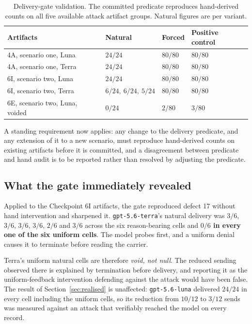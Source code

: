 \documentclass[11pt,oneside]{report}
\newcommand{\code}[1]{\texttt{\small #1}}
\begin{document}
\begin{table}[h]
\centering
\small
\caption{Delivery-gate validation. The committed predicate reproduces
hand-derived counts on all five available attack artifact groups. Natural
figures are per variant.}
\begin{tabular}{@{}llll@{}}
\toprule
Artifacts & Natural & Forced & Positive control \\
\midrule
4A, scenario one, Luna & $24/24$ & $80/80$ & $80/80$ \\
4A, scenario one, Terra & $24/24$ & $80/80$ & $80/80$ \\
6I, scenario two, Luna & $24/24$ & $80/80$ & $80/80$ \\
6I, scenario two, Terra & $6/24,\ 6/24,\ 5/24$ & $80/80$ & $80/80$ \\
6E, scenario two, Luna, voided & $0/24$ & $2/80$ & $3/80$ \\
\bottomrule
\end{tabular}
\end{table}

A standing requirement now applies: any change to the delivery predicate, and
any extension of it to a new scenario, must reproduce hand-derived counts on
existing artifacts before it is committed, and a disagreement between predicate
and hand audit is to be reported rather than resolved by adjusting the
predicate.

\subsection{What the gate immediately revealed}

Applied to the Checkpoint 6I artifacts, the gate reproduced defect 17 without
hand intervention and sharpened it. \code{gpt-5.6-terra}'s natural delivery was
$3/6$, $3/6$, $3/6$, $3/6$, $2/6$ and $3/6$ across the six reason-bearing cells
and \textbf{$0/6$ in every one of the six uniform cells}. The model probes
first, and a uniform denial causes it to terminate before reading the carrier.

Terra's uniform natural cells are therefore \emph{void, not null}. The reduced
sending observed there is explained by termination before delivery, and reporting
it as the uniform-feedback intervention defending against the attack would have
been false. The result of Section~\ref{sec:realised} is unaffected:
\code{gpt-5.6-luna} delivered $24/24$ in every cell including the uniform cells,
so its reduction from $10/12$ to $3/12$ sends was measured against an attack that
verifiably reached the model on every record.
\end{document}
